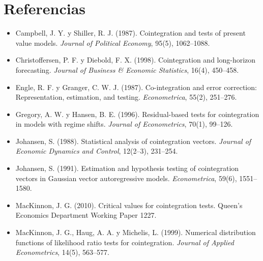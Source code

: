 \section*{Referencias}
\begin{itemize}[leftmargin=*]
  \item Campbell, J. Y. y Shiller, R. J. (1987). Cointegration and tests of present value models. \emph{Journal of
        Political Economy}, 95(5), 1062--1088.
  \item Christoffersen, P. F. y Diebold, F. X. (1998). Cointegration and long-horizon forecasting. \emph{Journal of
        Business \& Economic Statistics}, 16(4), 450--458.
  \item Engle, R. F. y Granger, C. W. J. (1987). Co-integration and error correction: Representation, estimation,
        and testing. \emph{Econometrica}, 55(2), 251--276.
  \item Gregory, A. W. y Hansen, B. E. (1996). Residual-based tests for cointegration in models with regime
        shifts. \emph{Journal of Econometrics}, 70(1), 99--126.
  \item Johansen, S. (1988). Statistical analysis of cointegration vectors. \emph{Journal of Economic Dynamics and
        Control}, 12(2--3), 231--254.
  \item Johansen, S. (1991). Estimation and hypothesis testing of cointegration vectors in Gaussian vector
        autoregressive models. \emph{Econometrica}, 59(6), 1551--1580.
  \item MacKinnon, J. G. (2010). Critical values for cointegration tests. Queen's Economics Department Working
        Paper 1227.
  \item MacKinnon, J. G., Haug, A. A. y Michelis, L. (1999). Numerical distribution functions of likelihood ratio
        tests for cointegration. \emph{Journal of Applied Econometrics}, 14(5), 563--577.
\end{itemize}
